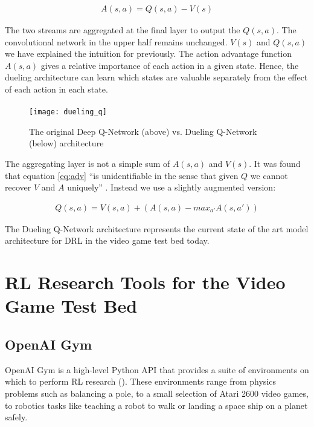 \begin{align}
    \label{eq:adv}
    A(s, a) =  Q(s, a) - V(s)
\end{align}

The two streams are aggregated at the final layer to output the $Q(s, a)$. The convolutional network in the upper half remains unchanged. $V(s)$ and $Q(s, a)$ we have explained the intuition for previously. The action advantage function $A(s, a)$ gives a relative importance of each action in a given state. Hence, the dueling architecture can learn which states are valuable separately from the effect of each action in each state. \paragraph{}

\begin{figure}[h]
    \centering
    \texttt{[image: dueling\_q]}
    \caption{The original Deep Q-Network (above) vs. Dueling Q-Network (below) architecture}
\end{figure}

The aggregating layer is not a simple sum of $A(s, a)$ and $V(s)$. It was found that equation \ref{eq:adv} ``is unidentifiable in the sense that given $Q$ we cannot recover $V$ and $A$ uniquely'' \cite{dueling}. Instead we use a slightly augmented version:

\begin{align}
    Q(s, a) = V(s, a) + (A(s, a) - max_{a'} A(s, a'))
\end{align}

The Dueling Q-Network architecture represents the current state of the art model architecture for DRL in the video game test bed today.

\section{RL Research Tools for the Video Game Test Bed}
\subsection{OpenAI Gym}
OpenAI Gym is a high-level Python API that provides a suite of environments on which to perform RL research (\cite{openaigym}). These environments range from physics problems such as balancing a pole, to a small selection of Atari 2600 video games, to robotics tasks like teaching a robot to walk or landing a space ship on a planet safely.

